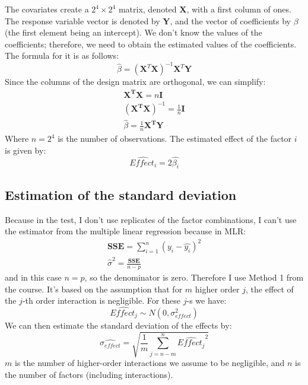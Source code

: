\documentclass{article}
\begin{document}
The covariates create a $2^4\times2^4$ matrix, denoted $\mathbf{X}$, with a first column of ones. The response variable vector is denoted by $\mathbf{Y}$, and the vector of coefficients by $\beta$ (the first element being an intercept). We don't know the values of the coefficients; therefore, we need to obtain the estimated values of the coefficients. The formula for it is as follows:
\begin{equation}
    \hat{\beta} = (\mathbf{X}^T \mathbf{X})^{-1} \mathbf{X}^T \mathbf{Y}
\end{equation}
Since the columns of the design matrix are orthogonal, we can simplify:
\begin{align}
    \mathbf{X^TX} = n\mathbf{I}                              \\
    \left(\mathbf{X^TX} \right)^{-1} = \frac{1}{n}\mathbf{I} \\
    \hat{\beta} = \frac{1}{n}\mathbf{X^TY}
\end{align}
Where $n=2^4$ is the number of observations. The estimated effect of the factor $i$ is given by:
\begin{equation}
    \widehat{Effect_i} = 2\hat{\beta_i}
\end{equation}

\subsection{Estimation of the standard deviation}
\label{subsec:std_estim}

Because in the test, I don't use replicates of the factor combinations, I can't use the estimator from the multiple linear regression because in MLR:
\begin{align}
    \mathbf{SSE} = \sum_{i=1}^{n} \left(y_i - \hat{y_i} \right)^2 \\
    \hat{\sigma}^2 = \frac{\mathbf{SSE}}{n-p}
\end{align}
and in this case $n=p$, so the denominator is zero. Therefore I use Method 1 from the course. It's based on the assumption that for $m$ higher order $j$, the effect of the $j$-th order interaction is negligible. For these $j$-s we have:
\begin{equation}
    \widehat{Effect_j} \sim N(0, \sigma_{effect}^2)
\end{equation}
We can then estimate the standard deviation of the effects by:
\begin{equation}
    \widehat{\sigma_{effect}} = \sqrt{\frac{1}{m} \sum_{j=n-m}^{n} \widehat{Effect_j}^2}
\end{equation}
$m$ is the number of higher-order interactions we assume to be negligible, and $n$ is the number of factors (including interactions).
\end{document}
